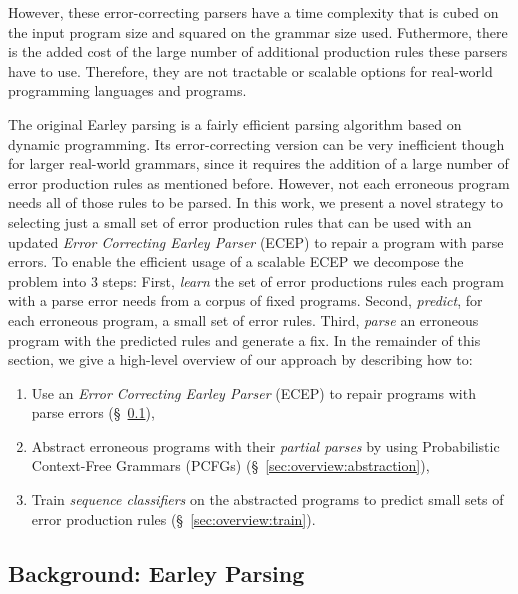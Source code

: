  However, these error-correcting parsers have a time
complexity that is cubed on the input program size and squared on the grammar
size used. Futhermore, there is the added cost of the large number of additional
production rules these parsers have to use. Therefore, they are not tractable or
scalable options for real-world programming languages and programs.


 The original Earley
parsing is a fairly efficient parsing algorithm \citep{?} based on dynamic
programming. Its error-correcting version can be very inefficient though for
larger real-world grammars, since it requires the addition of a large number of
error production rules as mentioned before. However, not each erroneous program
needs all of those rules to be parsed. In this work, we present a novel strategy
to selecting just a small set of error production rules that can be used with an
updated \emph{Error Correcting Earley Parser} (ECEP) to repair a program with
parse errors.
%
To enable the efficient usage of a scalable ECEP we decompose the problem into 3
steps:
%
First, \emph{learn} the set of error productions rules each program with a parse
error needs from a corpus of fixed programs.
%
Second, \emph{predict}, for each erroneous program, a small set of error rules.
%
Third, \emph{parse} an erroneous program with the predicted rules and generate a
fix.
%
In the remainder of this section, we give a high-level overview
of our approach by describing how to:

\begin{enumerate}

  \item Use an \emph{Error Correcting Earley Parser} (ECEP) to repair programs
  with parse errors (\S~\ref{sec:overview:earleyparsing}),

  \item Abstract erroneous programs with their \emph{partial parses} by using
  Probabilistic Context-Free Grammars (PCFGs)
  (\S~\ref{sec:overview:abstraction}),

  \item Train \emph{sequence classifiers} on the abstracted programs to predict
  small sets of error production rules (\S~\ref{sec:overview:train}).

\end{enumerate}

\subsection{Background: Earley Parsing}
\label{sec:overview:earleyparsing}


